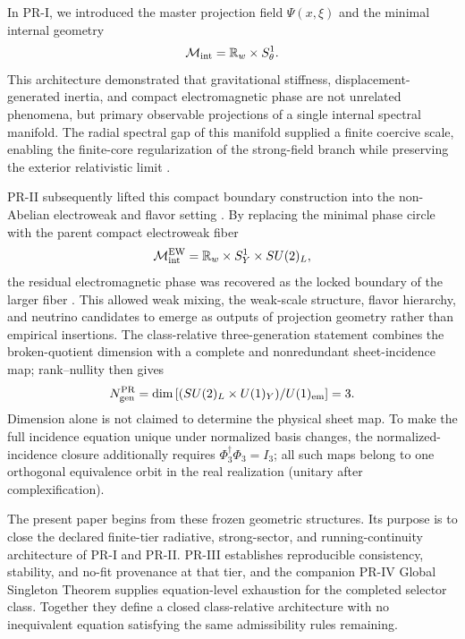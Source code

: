 \documentclass[11pt]{article}
\begin{document}
In PR-I, we introduced the master projection field $\Psi(x,\xi)$ and the minimal internal geometry 
\begin{equation}
\mathcal{M}_{\rm int} = \mathbb{R}_w \times S_\theta^1.
\end{equation}
This architecture demonstrated that gravitational stiffness, displacement-generated inertia, and compact electromagnetic phase are not unrelated phenomena, but primary observable projections of a single internal spectral manifold. The radial spectral gap of this manifold supplied a finite coercive scale, enabling the finite-core regularization of the strong-field branch while preserving the exterior relativistic limit \cite{OshetskiPR1Zenodo2026}. 

PR-II subsequently lifted this compact boundary construction into the non-Abelian electroweak and flavor setting \cite{OshetskiPR2Zenodo2026}. By replacing the minimal phase circle with the parent compact electroweak fiber 
\begin{equation}
\mathcal{M}_{\rm int}^{\rm EW} = \mathbb{R}_w \times S_Y^1 \times SU(2)_L,
\end{equation}
the residual electromagnetic phase was recovered as the locked boundary of the larger fiber \cite{OshetskiPR2Zenodo2026}. This allowed weak mixing, the weak-scale structure, flavor hierarchy, and neutrino candidates to emerge as outputs of projection geometry rather than empirical insertions. The class-relative three-generation statement combines the broken-quotient dimension with a complete and nonredundant sheet-incidence map; rank--nullity then gives
\begin{equation}
N_{\rm gen}^{\rm PR} = \dim\left[(SU(2)_L \times U(1)_Y)/U(1)_{\rm em}\right] = 3.
\end{equation}
Dimension alone is not claimed to determine the physical sheet map.  To make the full incidence equation unique under normalized basis changes, the normalized-incidence closure additionally requires $\Phi_3^\dagger\Phi_3=I_3$; all such maps belong to one orthogonal equivalence orbit in the real realization (unitary after complexification).

The present paper begins from these frozen geometric structures.  Its purpose is to close the declared finite-tier radiative, strong-sector, and running-continuity architecture of PR-I and PR-II.  PR-III establishes reproducible consistency, stability, and no-fit provenance at that tier, and the companion PR-IV Global Singleton Theorem supplies equation-level exhaustion for the completed selector class.  Together they define a closed class-relative architecture with no inequivalent equation satisfying the same admissibility rules remaining.
\end{document}
